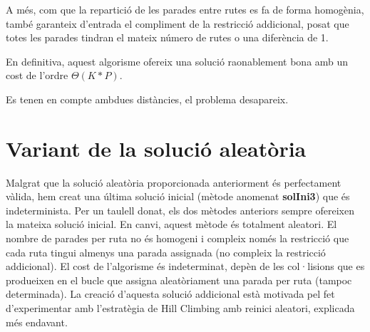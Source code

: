 A més, com que la repartició de les parades entre rutes es fa de forma homogènia, també garanteix d'entrada el compliment de la restricció addicional, posat que totes les parades tindran el mateix número de rutes o una diferència de 1.

En definitiva, aquest algorisme ofereix una solució raonablement bona amb un cost de l'ordre $\Theta(K * P)$.


 {Es tenen en compte ambdues distàncies, el problema desapareix.}

\section{Variant de la solució aleatòria}

Malgrat que la solució aleatòria proporcionada anteriorment és perfectament vàlida, hem creat una última solució inicial (mètode anomenat \textbf{solIni3}) que és indeterminista. Per un taulell donat, els dos mètodes anteriors sempre ofereixen la mateixa solució inicial. En canvi, aquest mètode és totalment aleatori. El nombre de parades per ruta no és homogeni i compleix només la restricció que cada ruta tingui almenys una parada assignada (no compleix la restricció addicional). El cost de l'algorisme és indeterminat, depèn de les col·lisions que es produeixen en el bucle que assigna aleatòriament una parada per ruta (tampoc determinada). La creació d'aquesta solució addicional està motivada pel fet d'experimentar amb l'estratègia de Hill Climbing amb reinici aleatori, explicada més endavant.

